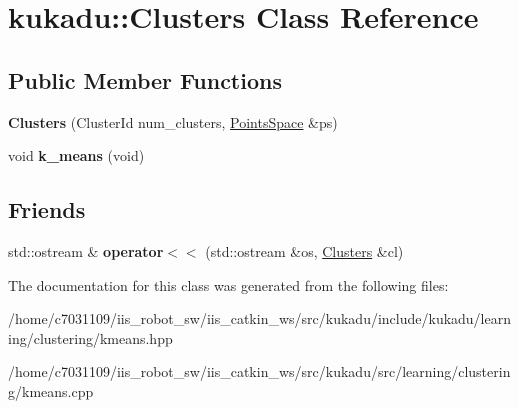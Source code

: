 \hypertarget{classkukadu_1_1Clusters}{\section{kukadu\-:\-:Clusters Class Reference}
\label{classkukadu_1_1Clusters}
}
\subsection*{Public Member Functions}
\begin{DoxyCompactItemize}
\item 
\hypertarget{classkukadu_1_1Clusters_ad51562cbdd79886e320e3bd135e09fa7}{{\bfseries Clusters} (Cluster\-Id num\-\_\-clusters, \hyperlink{classkukadu_1_1PointsSpace}{Points\-Space} \&ps)}\label{classkukadu_1_1Clusters_ad51562cbdd79886e320e3bd135e09fa7}

\item 
\hypertarget{classkukadu_1_1Clusters_abbecb3ad5bb32ceeea328b71cd63264c}{void {\bfseries k\-\_\-means} (void)}\label{classkukadu_1_1Clusters_abbecb3ad5bb32ceeea328b71cd63264c}

\end{DoxyCompactItemize}
\subsection*{Friends}
\begin{DoxyCompactItemize}
\item 
\hypertarget{classkukadu_1_1Clusters_a0cd1d4240f35d52f39b3d3ac51be49b8}{std\-::ostream \& {\bfseries operator$<$$<$} (std\-::ostream \&os, \hyperlink{classkukadu_1_1Clusters}{Clusters} \&cl)}\label{classkukadu_1_1Clusters_a0cd1d4240f35d52f39b3d3ac51be49b8}

\end{DoxyCompactItemize}


The documentation for this class was generated from the following files\-:\begin{DoxyCompactItemize}
\item 
/home/c7031109/iis\-\_\-robot\-\_\-sw/iis\-\_\-catkin\-\_\-ws/src/kukadu/include/kukadu/learning/clustering/kmeans.\-hpp\item 
/home/c7031109/iis\-\_\-robot\-\_\-sw/iis\-\_\-catkin\-\_\-ws/src/kukadu/src/learning/clustering/kmeans.\-cpp\end{DoxyCompactItemize}
